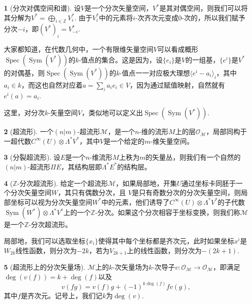 \documentclass[11pt]{article}
\theoremstyle{definition}
\newtheorem{para}{}[section]
\theoremstyle{plain}
\begin{document}
\begin{para}[分次对偶空间和谱]
    设$V$是一个分次矢量空间，$V^*$是其对偶空间，则我们可以将其分解为$V^*=\bigoplus_{i\in\mathbb Z}V_i^*$. 由于$V_i^*$中的元素将$i$-次齐次元变成$0$-次的，所以我们赋予分次$-i$，即$(V^*)_i=V_{-i}^*$.

    大家都知道，在代数几何中，一个有限维矢量空间$V$可以看成概形$\operatorname{Spec}(\operatorname{Sym}(V^*))$的$k$-值点的集合。这是因为，设$\{e_i\}$是$V$的一组基，$\{e^i\}$是$V^*$的对偶基，则$\operatorname{Spec}(\operatorname{Sym}(V^*))$的$k$-值点一一对应极大理想$\langle e^i-a_i\rangle_i$，其中$a_i\in k$，而这也自然对应着$a=\sum_i a_ie_i\in V$，因为通过赋值映射，自然就有$e^i(a)=a_i$.

    这里，对分次$k$-矢量空间$V$，类似地可以定义出$\operatorname{Spec}(\operatorname{Sym}(V^*))$.
\end{para}

\begin{para}[超流形]
一个$(n|m)$-超流形$\mathcal M$，是一个$n$-维的流形$M$上的层$\mathcal O_{\mathcal M}$，局部同构于一超代数$C^\infty(U)\otimes \Lambda^* V^*$，其中$V$是一个给定的$m$-维矢量空间。
\end{para}

\begin{para}[分裂超流形]
设$E$是一个$n$-维流形$M$上秩为$m$的矢量丛，则我们有一个自然的$(n|m)$-超流形$\Pi E$，其结构层即$\Lambda^* E^*$的结构层。
\end{para}

\begin{para}[$\mathbb Z$-分次超流形]
给定一个超流形$\mathcal M$，如果局部地，开集$U$通过坐标卡同胚于一个分次矢量空间$W$，其只有偶数分次，且
$V$是只有奇数分次的分次矢量空间，则局部坐标可以视为分次矢量空间$W^*$中的元素，他们诱导了$C^\infty(U)\otimes \Lambda^* V^*$的子代数$\operatorname{Sym}(W^*)\otimes \Lambda^* V^*$上的一个$\mathbb Z$-分次。如果这个分次相容于坐标变换，则我们称$\mathcal M$是一个$\mathbb Z$-分次超流形。
\end{para}

局部地，我们可以选取坐标$\{x_i\}$使得其中每个坐标都是齐次元，此时如果坐标$x^i$是$W_{2k}$线性函数，则分次为$-2k$，若为$V_{2k+1}$上的线性函数，则分次为$-(2k+1)$.

\begin{para}[超流形上的分次矢量场]
    $\mathcal M$上的$k$-次矢量场为$k$-次导子$v:\mathcal O_{\mathcal M}\to \mathcal O_{\mathcal M}$，即满足$\deg (v(f))=k+\deg(f)$以及
    \[
        v(fg)=v(f)g+(-1)^{k\deg(f)}fv(g),
    \]
    其中$f$是齐次元。记号上，我们记$k$为$\deg(v)$.
\end{para}
\end{document}
